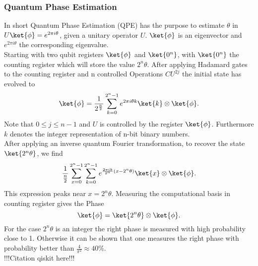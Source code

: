\documentclass[../../main.tex]{subfiles}
\begin{document}
\subsubsection{Quantum Phase Estimation}\label{sec:QPE}
In short Quantum Phase Estimation (QPE) has the purpose to estimate $\theta$ in $U\ket{\phi} = e^{2 \pi i \theta }$, given a unitary operator $U$.
$\ket{\phi}$ is an eigenvector and $e^{2 \pi i \theta }$ the corresponding eigenvalue.\\
Starting with two qubit registers $\ket{\phi}$ and $\ket{0^n}$, with $\ket{0^n}$ the counting register
which will store the value $2^n \theta$. After applying Hadamard gates to the counting register and n controlled Operations $CU^{2j}$ the initial state has evolved to
\begin{equation}
  \ket{\phi} = \frac{1}{2^{\frac{n}{2}}} \sum_{k=0}^{2^n-1} e^{2 \pi i \theta k} \ket{k} \otimes \ket{\phi}.
\end{equation}
Note that $0 \le j \le n-1$ and $U$ is controlled by the register $\ket{\phi}$. Furthermore $k$ denotes the integer representation of n-bit binary numbers.\\
After applying  an inverse quantum Fourier transformation, to recover the state $\ket{2^n \theta}$, we find
\begin{equation}
  \frac{1}{\frac{n}{2}} \sum_{x=0}^{2^n-1} \sum_{k=0}^{2^n-1} e^{\frac{2 \pi i k}{2^n}(x - 2^n \theta)} \ket{x} \otimes \ket{\phi}.
\end{equation}
This expression peaks near $x=2^n \theta$. Measuring the computational basis in counting register gives the Phase
\begin{equation}
  \ket{\phi} = \ket{2^n \theta} \otimes \ket{\phi}.
\end{equation}
For the case $2^n \theta$ is an integer the right phase is measured with high probability close to 1. Otherwise it can be shown that one measures the right phase
with probability better than $\frac{4}{\pi^2} \approx 40 \% $.\\
!!!Citation qiskit here!!!
\end{document}

